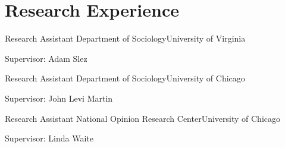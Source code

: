 
\section*{Research Experience}

{Research Assistant}
{Department of Sociology\newline University of Virginia}
{\item[] Supervisor: Adam Slez}
  
{Research Assistant}
{Department of Sociology\newline University of Chicago}
{\item[] Supervisor: John Levi Martin}

{Research Assistant}
{National Opinion Research Center\newline University of Chicago}
{\item[] Supervisor: Linda Waite}
